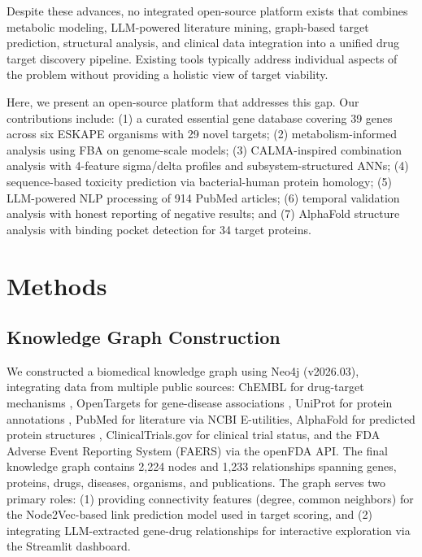 \documentclass[12pt,a4paper]{article}
\begin{document}
Despite these advances, no integrated open-source platform exists that combines metabolic modeling, LLM-powered literature mining, graph-based target prediction, structural analysis, and clinical data integration into a unified drug target discovery pipeline. Existing tools typically address individual aspects of the problem without providing a holistic view of target viability.

Here, we present an open-source platform that addresses this gap. Our contributions include: (1) a curated essential gene database covering 39 genes across six ESKAPE organisms with 29 novel targets; (2) metabolism-informed analysis using FBA on genome-scale models; (3) CALMA-inspired combination analysis with 4-feature sigma/delta profiles and subsystem-structured ANNs; (4) sequence-based toxicity prediction via bacterial-human protein homology; (5) LLM-powered NLP processing of 914 PubMed articles; (6) temporal validation analysis with honest reporting of negative results; and (7) AlphaFold structure analysis with binding pocket detection for 34 target proteins.

\section{Methods}

\subsection{Knowledge Graph Construction}
We constructed a biomedical knowledge graph using Neo4j (v2026.03), integrating data from multiple public sources: ChEMBL for drug-target mechanisms \citep{mendez2019}, OpenTargets for gene-disease associations \citep{ochoa2021}, UniProt for protein annotations \citep{uniprot2023}, PubMed for literature via NCBI E-utilities, AlphaFold for predicted protein structures \citep{jumper2021}, ClinicalTrials.gov for clinical trial status, and the FDA Adverse Event Reporting System (FAERS) via the openFDA API. The final knowledge graph contains 2,224 nodes and 1,233 relationships spanning genes, proteins, drugs, diseases, organisms, and publications. The graph serves two primary roles: (1) providing connectivity features (degree, common neighbors) for the Node2Vec-based link prediction model used in target scoring, and (2) integrating LLM-extracted gene-drug relationships for interactive exploration via the Streamlit dashboard.
\end{document}
